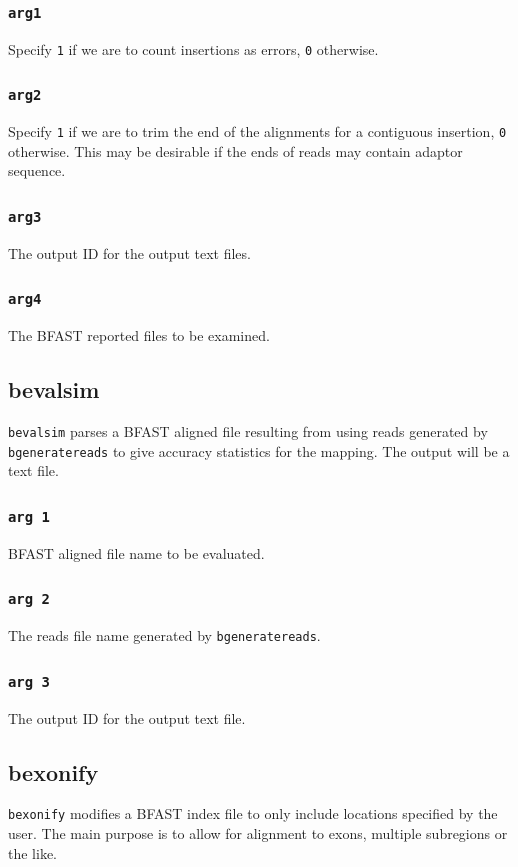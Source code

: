\documentclass[a4paper,12pt]{book}
\newcommand{\TT}[1]{{\tt #1}} %
\newcommand{\BIF}{BFAST index file} %
\newcommand{\BAF}{BFAST aligned file} %
\newcommand{\BRF}{BFAST reported file} %
\begin{document}
\subsubsection{\TT{arg1}}
Specify \TT{1} if we are to count insertions as errors, \TT{0} otherwise.
\subsubsection{\TT{arg2}}
Specify \TT{1} if we are to trim the end of the alignments for a contiguous insertion, \TT{0} otherwise.
This may be desirable if the ends of reads may contain adaptor sequence. 
\subsubsection{\TT{arg3}}
The output ID for the output text files.
\subsubsection{\TT{arg4}}
The \BRF{s} to be examined.


\subsection{bevalsim}
\label{sec:bevalsim}
\TT{bevalsim} parses a \BAF{} resulting from using reads generated by \TT{bgeneratereads} to give accuracy statistics for the mapping.
The output will be a text file.

\subsubsection{\TT{arg 1}}
\BAF{} name to be evaluated.

\subsubsection{\TT{arg 2}}
The reads file name generated by \TT{bgeneratereads}.

\subsubsection{\TT{arg 3}}
The output ID for the output text file.

\subsection{bexonify}
\label{sec:bexonify}
\TT{bexonify} modifies a \BIF{} to only include locations specified by the user.  
The main purpose is to allow for alignment to exons, multiple subregions or the like.
\end{document}

